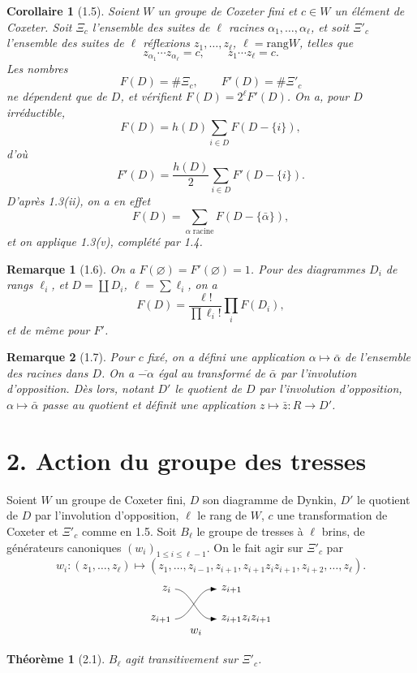 \documentclass[11pt]{article}
\newcommand{\braidMoveSketch}{%
\begin{tikzpicture}[scale=.9,baseline=-.5ex]
  \draw[-{Latex[length=2mm]}] (0,.75) node[left]{$z_i$} .. controls (.55,.75) and (.75,-.28) .. (1.45,-.28) node[right]{$z_{i+1}z_i z_{i+1}$};
  \draw[-{Latex[length=2mm]}] (0,-.28) node[left]{$z_{i+1}$} .. controls (.55,-.28) and (.75,.75) .. (1.45,.75) node[right]{$z_{i+1}$};
  \node at (.72,-.72){$w_i$};
\end{tikzpicture}%
}
\newcommand{\card}{\#}
\newcommand{\rank}{\mathrm{rang}}
\theoremstyle{plainfr}
\newtheorem*{theoreme}{Théorème}
\newtheorem*{corollaire}{Corollaire}
\newtheorem*{remarque}{Remarque}
\begin{document}
\begin{corollaire}[1.5]
Soient $W$ un groupe de Coxeter fini et $c\in W$ un élément de Coxeter. Soit $\Xi_c$ l'ensemble des suites de $\ell$ racines $\alpha_1,\ldots,\alpha_\ell$, et soit $\Xi'_c$ l'ensemble des suites de $\ell$ réflexions $z_1,\ldots,z_\ell$, $\ell=\rank W$, telles que
\[
 z_{\alpha_1}\cdots z_{\alpha_\ell}=c,\qquad z_1\cdots z_\ell=c.
\]
Les nombres
\[
 F(D)=\card\Xi_c,\qquad F'(D)=\card\Xi'_c
\]
ne dépendent que de $D$, et vérifient $F(D)=2^\ell F'(D)$. On a, pour $D$ irréductible,
\[
 F(D)=h(D)\sum_{i\in D}F(D-\{i\}),
\]
d'où
\[
 F'(D)=\frac{h(D)}{2}\sum_{i\in D}F'(D-\{i\}).
\]
D'après 1.3(ii), on a en effet
\[
 F(D)=\sum_{\alpha\;\mathrm{racine}}F(D-\{\bar\alpha\}),
\]
et on applique 1.3(v), complété par 1.4.
\end{corollaire}

\begin{remarque}[1.6]
On a $F(\varnothing)=F'(\varnothing)=1$. Pour des diagrammes $D_i$ de rangs $\ell_i$, et $D=\coprod D_i$, $\ell=\sum\ell_i$, on a
\[
 F(D)=\frac{\ell!}{\prod\ell_i!}\prod_i F(D_i),
\]
et de même pour $F'$.
\end{remarque}

\begin{remarque}[1.7]
Pour $c$ fixé, on a défini une application $\alpha\mapsto\bar\alpha$ de l'ensemble des racines dans $D$. On a $\overline{-\alpha}$ égal au transformé de $\bar\alpha$ par l'involution d'opposition. Dès lors, notant $D'$ le quotient de $D$ par l'involution d'opposition, $\alpha\mapsto\bar\alpha$ passe au quotient et définit une application $z\mapsto \bar z:R\to D'$.
\end{remarque}

\section*{2. Action du groupe des tresses}

Soient $W$ un groupe de Coxeter fini, $D$ son diagramme de Dynkin, $D'$ le quotient de $D$ par l'involution d'opposition, $\ell$ le rang de $W$, $c$ une transformation de Coxeter et $\Xi'_c$ comme en 1.5. Soit $B_\ell$ le groupe de tresses à $\ell$ brins, de générateurs canoniques $(w_i)_{1\le i\le \ell-1}$. On le fait agir sur $\Xi'_c$ par
\[
 w_i:(z_1,\ldots,z_\ell)\longmapsto (z_1,\ldots,z_{i-1},z_{i+1},z_{i+1}z_i z_{i+1},z_{i+2},\ldots,z_\ell).
\]
\[
\braidMoveSketch
\]

\begin{theoreme}[2.1]
$B_\ell$ agit transitivement sur $\Xi'_c$.
\end{theoreme}
\end{document}
